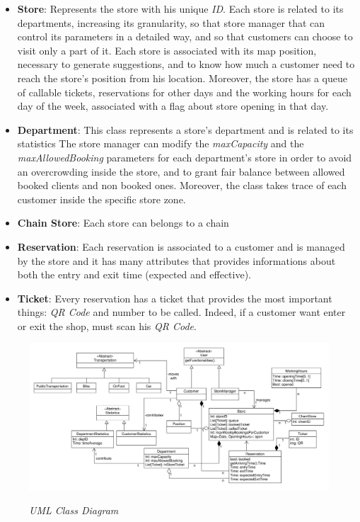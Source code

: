 \documentclass{article}
\begin{document}
\begin{itemize}
\begin{itemize}
				\end{itemize}
			
				\item {\bfseries Store}: Represents the store with his unique \emph{ID}. Each store is related to its departments, increasing its granularity, so that store manager that can control its parameters in a detailed way, and so that customers can choose to visit only a part of it. Each store is associated with its map position, necessary to generate suggestions, and to know how much a customer need to reach the store's position from his location. Moreover, the store has a  queue of callable tickets, reservations for other days and the working hours for each day of the week, associated with a flag about store opening in that day.
				
				\item {\bfseries Department}: This class represents a store's department and is related to its statistics The store manager can modify the \emph{maxCapacity} and the \emph{maxAllowedBooking} parameters for each department's store in order to avoid an overcrowding inside the store, and to grant fair balance between allowed booked clients and non booked ones. Moreover, the class takes trace of each customer inside the specific store zone.
				
				\item {\bfseries Chain Store}: Each store can belongs to a chain
				
				\item {\bfseries Reservation}: Each reservation is associated to a customer and is managed by the store and it has many attributes that provides informations about both the entry and exit time (expected and effective).
				
				\item {\bfseries Ticket}: Every reservation has a ticket that provides the most important things: \emph{QR Code} and number to be called. Indeed, if a customer want enter or exit the shop, must scan his \emph{QR Code}.
			\end{itemize}
		
		\begin{figure}
			\begin{adjustwidth}{-3cm}{}
				\centering
				\includegraphics[scale=0.43, angle=90, trim= 0 0 0 -5cm]{ClassDiagrams/classDiagram.pdf} \\
				\caption{\emph{UML Class Diagram}}
			\end{adjustwidth}
		\end{figure}
	
\end{document}
